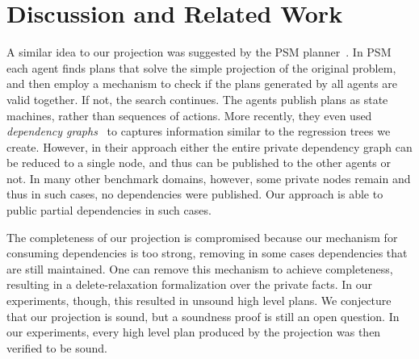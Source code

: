 \documentclass[letterpaper]{article}
\theoremstyle{definition}
\begin{document}
\section{Discussion and Related Work}

A similar idea to our projection was suggested by the PSM planner~\cite{jakubuv2015multiagent}. In PSM each agent finds plans that solve the simple projection of the original problem, and then employ a mechanism to check if the plans generated by all agents are valid together. If not, the search continues. The agents publish plans as state machines, rather than sequences of actions. More recently, they even used {\em dependency graphs}~\cite{tozicka2015internally} to captures information similar to the regression trees we create. However, in their approach either the entire private dependency graph can be reduced to a single node, and thus can be published to the other agents or not. In many other benchmark domains, however, some private nodes remain and thus in such cases, no dependencies were published. Our approach is able to public partial dependencies in such cases.




The completeness of our projection is compromised because our mechanism for consuming dependencies is too strong, removing in some cases dependencies that are still maintained. One can remove this mechanism to achieve completeness, resulting in a delete-relaxation formalization over the private facts. In our experiments, though, this resulted in unsound high level plans. %
We conjecture that our projection is sound, but a soundness proof is still an open question. In our experiments, every high level plan produced by the projection was then verified to be sound.
\end{document}
